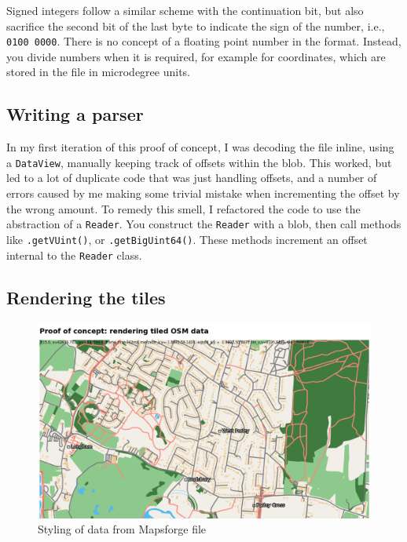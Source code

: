 \documentclass[hyphens]{final_report}
\begin{document}
Signed integers follow a similar scheme with the continuation bit, but also sacrifice the second bit of the last byte to indicate the sign of the number, i.e., \texttt{0100 0000}. There is no concept of a floating point number in the format. Instead, you divide numbers when it is required, for example for coordinates, which are stored in the file in microdegree units.

\subsection{Writing a parser}

In my first iteration of this proof of concept, I was decoding the file inline, using a \texttt{DataView}, manually keeping track of offsets within the blob. This worked, but led to a lot of duplicate code that was just handling offsets, and a number of errors caused by me making some trivial mistake when incrementing the offset by the wrong amount. To remedy this smell, I refactored the code to use the abstraction of a \texttt{Reader}. You construct the \texttt{Reader} with a blob, then call methods like \texttt{.getVUint()}, or \texttt{.getBigUint64()}. These methods increment an offset internal to the \texttt{Reader} class.

\subsection{Rendering the tiles}

\begin{figure}[ht]
    \centering
    \includegraphics[width=\textwidth]{../proof-of-concepts/4-rendering-osm-data/screenshots/styled.png}
    \caption{Styling of data from Mapsforge file}\label{fig:rendering-osm-data}
\end{figure}
\end{document}

